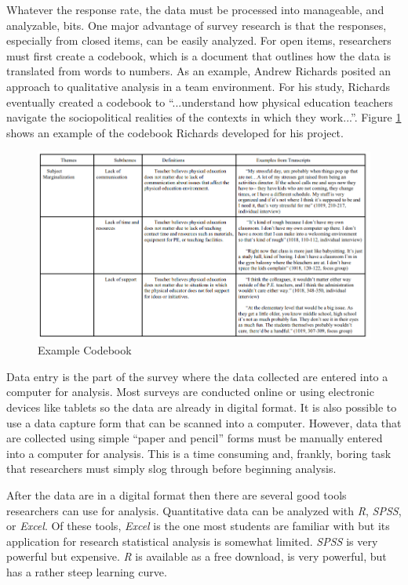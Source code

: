 Whatever the response rate, the data must be processed into manageable, and analyzable, bits. One major advantage of survey research is that the responses, especially from closed items, can be easily analyzed. For open items, researchers must first create a codebook, which is a document that outlines how the data is translated from words to numbers. As an example, Andrew Richards posited an approach to qualitative analysis in a team environment\cite{richards2018practical}. For his study, Richards eventually created a codebook to ``...understand how physical education teachers navigate the sociopolitical realities of the contexts in which they work...''. Figure \ref{fig08.02} shows an example of the codebook Richards developed for his project.

\begin{figure}[H]
	\centering
	\includegraphics[width=\maxwidth{.95\linewidth}]{gfx/08-codebook}
	\caption{Example Codebook}
	\label{fig08.02}
\end{figure}

Data entry is the part of the survey where the data collected are entered into a computer for analysis. Most surveys are conducted online or using electronic devices like tablets so the data are already in digital format. It is also possible to use a data capture form that can be scanned into a computer. However, data that are collected using simple ``paper and pencil'' forms must be manually entered into a computer for analysis. This is a time consuming and, frankly, boring task that researchers must simply slog through before beginning analysis.

After the data are in a digital format then there are several good tools researchers can use for analysis. Quantitative data can be analyzed with \textit{R}, \textit{SPSS}, or \textit{Excel}. Of these tools, \textit{Excel} is the one most students are familiar with but its application for research statistical analysis is somewhat limited. \textit{SPSS} is very powerful but expensive. \textit{R} is available as a free download, is very powerful, but has a rather steep learning curve. 

